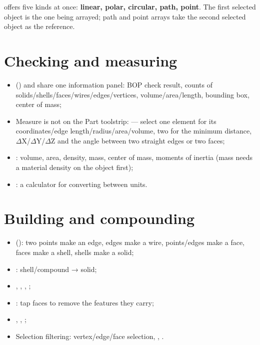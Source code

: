  offers five kinds at once: \textbf{linear, polar, circular, path, point}. The first selected object is
the one being arrayed; path and point arrays take the second selected object as the reference.

\section{Checking and measuring}

\begin{itemize}
  \item {} () and  share one information panel: BOP check
        result, counts of solids/shells/faces/wires/edges/vertices, volume/area/length, bounding box, center of mass;
  \item Measure is not on the Part toolstrip:  --- select one element for its
        coordinates/edge length/radius/area/volume, two for the minimum distance, $\Delta$X/$\Delta$Y/$\Delta$Z and the
        angle between two straight edges or two faces;
  \item {}: volume, area, density, mass, center of mass, moments of inertia (mass needs a material
        density on the object first);
  \item {}: a calculator for converting between units.
\end{itemize}

\section{Building and compounding}

\begin{itemize}
  \item {} (): two points make an edge, edges make a wire, points/edges make a face,
        faces make a shell, shells make a solid;
  \item {}: shell/compound → solid;
  \item {}, , , ;
  \item {}: tap faces to remove the features they carry;
  \item {}, , ;
  \item Selection filtering: vertex/edge/face selection, , .
\end{itemize}


